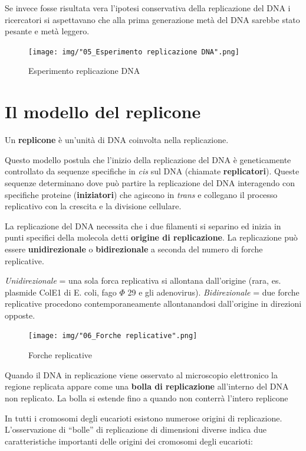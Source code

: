 \documentclass[11pt]{book}
\begin{document}
Se invece fosse risultata vera l'ipotesi conservativa della replicazione
del DNA i ricercatori si aspettavano che alla prima generazione metà del
DNA sarebbe stato pesante e metà leggero.

\begin{figure}[htp]
\centering
\texttt{[image: img/"05\_Esperimento replicazione DNA".png]}
\caption{Esperimento replicazione DNA}
\label{esperimento-replicazione-dna}
\end{figure}

\section{Il modello del replicone}\label{il-modello-del-replicone}

Un \textbf{replicone} è un'unità di DNA coinvolta nella replicazione.

Questo modello postula che l'inizio della replicazione del DNA è
geneticamente controllato da sequenze specifiche in \emph{cis} sul DNA
(chiamate \textbf{replicatori}). Queste sequenze determinano dove può
partire la replicazione del DNA interagendo con specifiche proteine
(\textbf{iniziatori}) che agiscono in \emph{trans} e collegano il
processo replicativo con la crescita e la divisione cellulare.

La replicazione del DNA necessita che i due filamenti si separino ed
inizia in punti specifici della molecola detti \textbf{origine di
replicazione}. La replicazione può essere \textbf{unidirezionale} o
\textbf{bidirezionale} a seconda del numero di forche replicative.

\emph{Unidirezionale} = una sola forca replicativa si allontana
dall'origine (rara, es. plasmide ColE1 di E. coli, fago \(\Phi\) 29 e
gli adenovirus). \emph{Bidirezionale} = due forche replicative procedono
contemporaneamente allontanandosi dall'origine in direzioni opposte.

\begin{figure}[htp]
\centering
\texttt{[image: img/"06\_Forche replicative".png]}
\caption{Forche replicative}
\label{forche-replicative}
\end{figure}

Quando il DNA in replicazione viene osservato al microscopio elettronico
la regione replicata appare come una \textbf{bolla di replicazione}
all'interno del DNA non replicato. La bolla si estende fino a quando non
conterrà l'intero replicone

In tutti i cromosomi degli eucarioti esistono numerose origini di
replicazione. L'osservazione di ``bolle'' di replicazione di dimensioni
diverse indica due caratteristiche importanti delle origini dei
cromosomi degli eucarioti:
\end{document}
